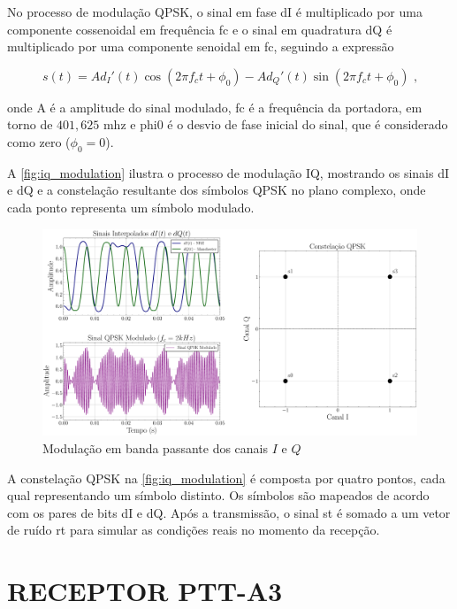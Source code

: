 No processo de modulação QPSK, o sinal em fase \gls{dI} é multiplicado por uma componente cossenoidal em frequência \gls{fc} e o sinal em quadratura \gls{dQ} é multiplicado por uma componente senoidal em \gls{fc}, seguindo a expressão

\vspace{-0.8em}
\begin{equation}
    s(t) = A d_I'(t) \cos(2\pi f_c t + \phi_0) - Ad_Q'(t) \sin(2\pi f_c t + \phi_0) \text{ ,}
\end{equation}

\noindent onde \gls{A} é a amplitude do sinal modulado, \gls{fc} é a frequência da portadora, em torno de $401,625$ \gls{mhz} e \gls{phi0} é o desvio de fase inicial do sinal, que é considerado como zero ($\phi_0 = 0$).

A \autoref{fig:iq_modulation} ilustra o processo de modulação IQ, mostrando os sinais \gls{dI} e \gls{dQ} e a constelação resultante dos símbolos \gls{QPSK} no plano complexo, onde cada ponto representa um símbolo modulado.

\begin{figure}[H]
	\centering
	\caption{Modulação em banda passante dos canais $I$ e $Q$}\label{fig:iq_modulation}
	\includegraphics[width=\linewidth]{assets/cap2/iq_modulation.pdf}
\end{figure}

A constelação \gls{QPSK} na \autoref{fig:iq_modulation} é composta por quatro pontos, cada qual representando um símbolo distinto. Os símbolos são mapeados de acordo com os pares de bits \gls{dI} e \gls{dQ}. Após a transmissão, o sinal \gls{st} é somado a um vetor de ruído \gls{rt} para simular as condições reais no momento da recepção.

\section{RECEPTOR PTT-A3}\label{sec:receptor}

